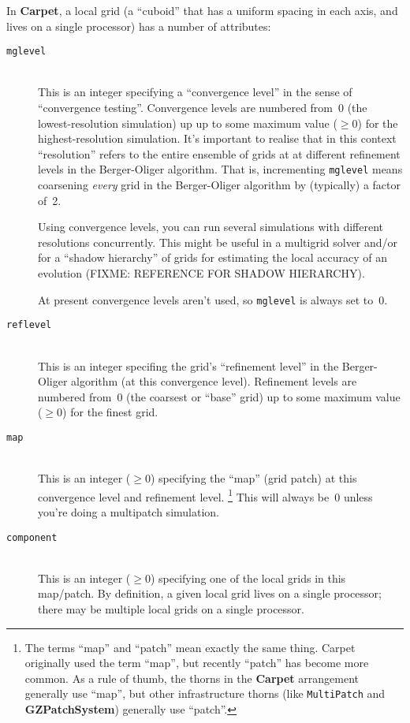 \documentclass{article}
\def\arrangement#1{\textbf{#1}}
\def\thorn#1{\textbf{#1}}
\begin{document}
In \thorn{Carpet}, a local grid (a ``cuboid'' that has a uniform spacing
in each axis, and lives on a single processor) has a number of attributes:
\begin{description}
\item[\texttt{mglevel}]%
\mbox{}\\
	This is an integer specifying a ``convergence level''
	in the sense of ``convergence testing''.  Convergence levels
	are numbered from~0 (the lowest-resolution simulation)
	up up to some maximum value ($\ge 0$) for the highest-resolution
	simulation.  It's important to realise that in this context
	``resolution'' refers to the entire ensemble of grids at
	at different refinement levels in the Berger-Oliger algorithm.
	That is, incrementing \texttt{mglevel} means coarsening
	\emph{every} grid in the Berger-Oliger algorithm by
	(typically) a factor of~2.

	Using convergence levels, you can run several simulations
	with different resolutions concurrently.  This might be useful
	in a multigrid solver and/or for a ``shadow hierarchy'' of
	grids for estimating the local accuracy of an evolution
	(FIXME: REFERENCE FOR SHADOW HIERARCHY).

	At present convergence levels aren't used, so \texttt{mglevel}
	is always set to~0.
\item[\texttt{reflevel}]%
\mbox{}\\
	This is an integer specifing the grid's ``refinement level''
	in the Berger-Oliger algorithm (at this convergence level).
	Refinement levels are numbered from~0 (the coarsest or ``base''
	grid) up to some maximum value ($\ge 0$) for the finest grid.
\item[\texttt{map}]
\mbox{}\\
	This is an integer ($\ge 0$) specifying the ``map'' (grid patch)
	at this convergence level and refinement level.%
\footnote{%
	 The terms ``map'' and ``patch'' mean exactly the same
	 thing.  Carpet originally used the term ``map'', but
	 recently ``patch'' has become more common.  As a rule of
	 thumb, the thorns in the \arrangement{Carpet} arrangement
	 generally use ``map'', but other infrastructure thorns
	 (like \texttt{MultiPatch} and \thorn{GZPatchSystem})
	 generally use ``patch''.
	 }%
{}	This will always be~0 unless you're doing a multipatch simulation.
\item[\texttt{component}]
\mbox{}\\
	This is an integer ($\ge 0$) specifying one of the local
	grids in this map/patch.  By definition, a given local grid
	lives on a single processor; there may be multiple local grids
	on a single processor.
\end{description}
\end{document}
